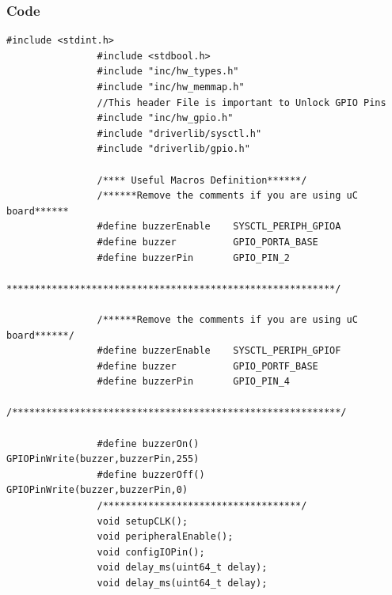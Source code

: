 \documentclass[a4paper,12pt,oneside]{article}
\begin{document}
			\subsubsection{\textbf{Code}}
			\begin{lstlisting}[style=CStyle]
				#include <stdint.h>
				#include <stdbool.h>
				#include "inc/hw_types.h"
				#include "inc/hw_memmap.h"
				//This header File is important to Unlock GPIO Pins
				#include "inc/hw_gpio.h"
				#include "driverlib/sysctl.h"
				#include "driverlib/gpio.h"
				
				/**** Useful Macros Definition******/
				/******Remove the comments if you are using uC board******
				#define buzzerEnable    SYSCTL_PERIPH_GPIOA
				#define buzzer          GPIO_PORTA_BASE
				#define buzzerPin       GPIO_PIN_2
				**********************************************************/
				
				/******Remove the comments if you are using uC board******/
				#define buzzerEnable    SYSCTL_PERIPH_GPIOF
				#define buzzer          GPIO_PORTF_BASE
				#define buzzerPin       GPIO_PIN_4
				/**********************************************************/
				
				#define buzzerOn()      GPIOPinWrite(buzzer,buzzerPin,255)
				#define buzzerOff()     GPIOPinWrite(buzzer,buzzerPin,0)
				/***********************************/
				void setupCLK();
				void peripheralEnable();
				void configIOPin();
				void delay_ms(uint64_t delay);
				void delay_ms(uint64_t delay);
				

\end{lstlisting}
\end{document}
